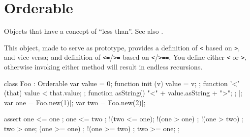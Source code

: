 
\section{Orderable}

Objects that have a concept of ``less than''.  See also
.

This object, made to serve as prototype, provides a definition of
\lstinline{<} based on \lstinline{>}, and vice versa; and definition
of \lstinline{<=}/\lstinline{>=} based on
\lstinline{<}/\lstinline{>}\lstinline{==}.  You  define
either \lstinline{<} or \lstinline{>}, otherwise invoking either
method will result in endless recursions.

\begin{urbiscript}[firstnumber=1]
class Foo : Orderable
{
  var value = 0;
  function init (v)   { value = v; };
  function '<' (that) { value < that.value; };
  function asString() { "<" + value.asString + ">"; };
}|;
var one = Foo.new(1)|;
var two = Foo.new(2)|;

assert
{
   one <= one  ;   one <= two  ; !(two <= one);
 !(one >  one) ; !(one >  two) ;   two >  one;
  (one >= one) ; !(one >= two) ;   two >= one;
};
\end{urbiscript}



